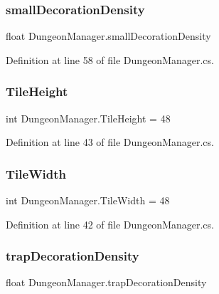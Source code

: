 \subsubsection{\texorpdfstring{smallDecorationDensity}{smallDecorationDensity}}
{\footnotesize\ttfamily float Dungeon\+Manager.\+small\+Decoration\+Density}



Definition at line 58 of file Dungeon\+Manager.\+cs.

\mbox{\label{class_dungeon_manager_aa96f4d9660ed44bb2c21b8b11ec2dbc3}} 
\subsubsection{\texorpdfstring{TileHeight}{TileHeight}}
{\footnotesize\ttfamily int Dungeon\+Manager.\+Tile\+Height = 48\hspace{0.3cm}{\ttfamily [static]}}



Definition at line 43 of file Dungeon\+Manager.\+cs.

\mbox{\label{class_dungeon_manager_a4090d1011387dda52819df07e9e76d6a}} 
\subsubsection{\texorpdfstring{TileWidth}{TileWidth}}
{\footnotesize\ttfamily int Dungeon\+Manager.\+Tile\+Width = 48\hspace{0.3cm}{\ttfamily [static]}}



Definition at line 42 of file Dungeon\+Manager.\+cs.

\mbox{\label{class_dungeon_manager_afe07ede1aa21fca0021660f0c0b1a536}} 
\subsubsection{\texorpdfstring{trapDecorationDensity}{trapDecorationDensity}}
{\footnotesize\ttfamily float Dungeon\+Manager.\+trap\+Decoration\+Density}




